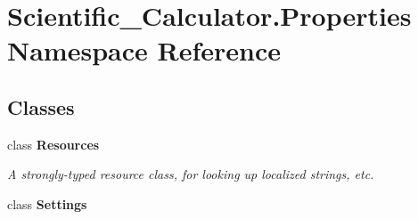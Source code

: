 \hypertarget{namespace_scientific___calculator_1_1_properties}{}\section{Scientific\+\_\+\+Calculator.\+Properties Namespace Reference}
\label{namespace_scientific___calculator_1_1_properties}
\subsection*{Classes}
\begin{DoxyCompactItemize}
\item 
class {\bfseries Resources}
\begin{DoxyCompactList}\small\item\em A strongly-\/typed resource class, for looking up localized strings, etc. \end{DoxyCompactList}\item 
class {\bfseries Settings}
\end{DoxyCompactItemize}
